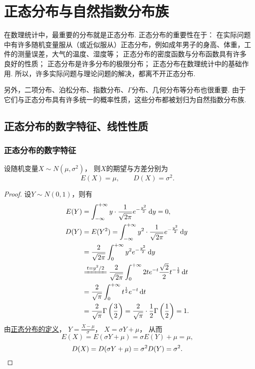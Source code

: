 \chapter{正态分布与自然指数分布族}

在数理统计中，最重要的分布就是正态分布.
正态分布的重要性在于：
在实际问题中有许多随机变量服从（或近似服从）正态分布，例如成年男子的身高、体重，工件的测量误差，大气的温度、湿度等；
正态分布的密度函数与分布函数具有许多良好的性质；
正态分布是许多分布的极限分布；
正态分布在数理统计中的基础作用.
所以，许多实际问题与理论问题的解决，都离不开正态分布.

另外，二项分布、泊松分布、指数分布、\(\Gamma\)分布、几何分布等分布也很重要.
由于它们与正态分布具有许多统一的概率性质，这些分布都被划归为自然指数分布族.

\section{正态分布的数字特征、线性性质}
\subsection{正态分布的数字特征}
\begin{theorem}\label{theorem:正态分布与自然指数分布族.正态分布的数字特征}
设随机变量\(X \sim N(\mu,\sigma^2)\)，
则\(X\)的期望与方差分别为\[
	E(X) = \mu,
	\qquad
	D(X) = \sigma^2.
\]
\begin{proof}
设\(Y \sim N(0,1)\)，则有\begin{align*}
	E(Y) &= \int_{-\infty}^{+\infty} y \cdot \frac{1}{\sqrt{2\pi}} e^{-\frac{y^2}{2}} \dd{y} = 0, \\
	D(Y) &= E(Y^2)
	= \int_{-\infty}^{+\infty} y^2 \cdot \frac{1}{\sqrt{2\pi}} e^{-\frac{y^2}{2}} \dd{y} \\
	&= \frac{2}{\sqrt{2\pi}} \int_0^{+\infty} y^2 e^{-\frac{y^2}{2}} \dd{y} \\
	&\xlongequal{t=y^2/2} \frac{2}{\sqrt{2\pi}} \int_0^{+\infty} 2 t e^{-t} \frac{\sqrt{2}}{2} t^{-\frac{1}{2}} \dd{t} \\
	&=\frac{2}{\sqrt{\pi}} \int_0^{+\infty} t^{\frac{1}{2}} e^{-t} \dd{t} \\
	&= \frac{2}{\sqrt{\pi}} \Gamma\left(\frac{3}{2}\right)
	= \frac{2}{\sqrt{\pi}} \cdot \frac{1}{2} \Gamma\left(\frac{1}{2}\right)
	= 1.
\end{align*}
由\hyperref[definition:正态分布.正态分布的定义]{正态分布的定义}，
\(Y = \frac{X-\mu}{\sigma}\)，
\(X = \sigma Y + \mu\)，
从而\[
	E(X) = E(\sigma Y + \mu) = \sigma E(Y) + \mu = \mu,
\]\[
	D(X) = D(\sigma Y + \mu) = \sigma^2 D(Y) = \sigma^2.
	\qedhere
\]
\end{proof}
\end{theorem}

